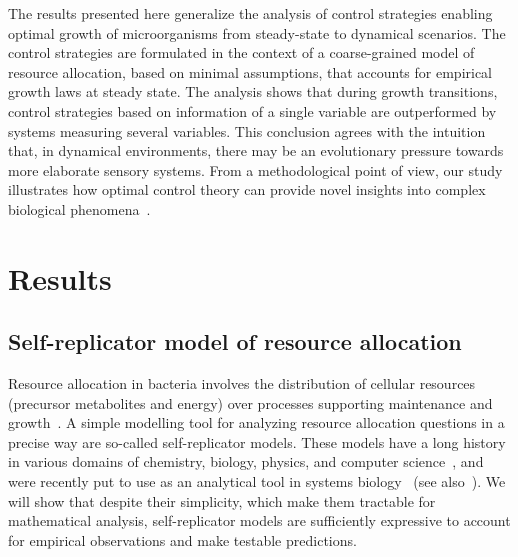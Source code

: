 The results presented here generalize the analysis of control strategies enabling optimal growth of microorganisms from steady-state to dynamical scenarios.
The control strategies are formulated in the context of a coarse-grained model of resource allocation, based on minimal assumptions, that accounts for empirical growth laws at steady state.
The analysis shows that during growth transitions, control strategies based on information of a single variable are outperformed by systems measuring several variables.
This conclusion agrees with the intuition that, in dynamical environments, there may be an evolutionary pressure towards more elaborate sensory systems.
From a methodological point of view, our study illustrates how optimal control theory can provide novel insights into complex biological phenomena~\cite{iglesias_control_2010}. 


\section{Results}

\subsection{Self-replicator model of resource allocation}
\label{sec:model}

Resource allocation in bacteria involves the distribution of cellular resources (precursor metabolites and energy) over processes supporting maintenance and growth~\cite{schaechter_microbe_2006}.
A simple modelling tool for analyzing resource allocation questions in a precise way are so-called self-replicator models.
These models have a long history in various domains of chemistry, biology, physics, and computer science~\cite{sipper_fifty_1998}, and were recently put to use as an analytical tool in systems biology~\cite{molenaar_shifts_2009} (see also~\cite{flamm_minimal_2007}).
We will show that despite their simplicity, which make them tractable for mathematical analysis, self-replicator models are sufficiently expressive to account for empirical observations and make testable predictions.

